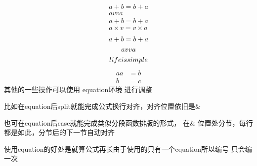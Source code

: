 \documentclass{article}
\begin{document}
    \begin{gather}
        a + b = b + a\\
        av  va
    \end{gather}
    \begin{gather*}
        a + b = b + a\\
        a\times v=v\times a
    \end{gather*}
    \begin{gather}
        a + b = b + a \notag \\
        av  va \notag \\
        life is simple
    \end{gather}
    \begin{align}
        aa &= b\\
        b  &= c
    \end{align}
    其他的一些操作可以使用
    equation环境
    进行调整

    比如在equation后split就能完成公式换行对齐，对齐位置依旧是\&

    也可在equation后case就能完成类似分段函数排版的形式，
    在\& 位置处分节，每行都是如此，分节后的下一节自动对齐

    使用equation的好处是就算公式再长由于使用的只有一个equation所以编号
    只会编一次
\end{document}
